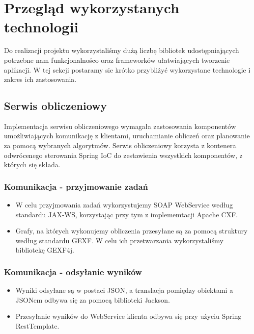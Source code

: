 \section{Przegląd wykorzystanych technologii}

Do realizacji projektu wykorzystaliśmy dużą liczbę bibliotek udostępniających potrzebne nam funkcjonalnośco oraz frameworków ułatwiających tworzenie aplikacji.
W tej sekcji postaramy sie krótko przybliżyć wykorzystane technologie i zakres ich zastosowania.

\subsection{Serwis obliczeniowy}

Implementacja serwisu obliczeniowego wymagała zastosowania komponentów umożliwiających komunikację z klientami, uruchamianie obliczeń oraz planowanie za pomocą wybranych algorytmów.
Serwis obliczeniowy korzysta z kontenera odwrócenego sterowania Spring IoC do zestawienia wszystkich komponentów, z których się składa.

\subsubsection{Komunikacja - przyjmowanie zadań}

\begin{itemize}
	\item W celu przyjmowania zadań wykorzystujemy SOAP WebService według standardu JAX-WS, korzystając przy tym z implememtacji Apache CXF.
	\item Grafy, na których wykonujemy obliczenia przesyłane są za pomocą struktury według standardu GEXF.
	W celu ich przetwarzania wykorzystaliśmy bibliotekę GEXF4j.
\end{itemize}

\subsubsection{Komunikacja - odsyłanie wyników}

\begin{itemize}
	\item Wyniki odsyłane są w postaci JSON, a translacja pomiędzy obiektami a JSONem odbywa się za pomocą biblioteki Jackson.
	\item Przesyłanie wyników do WebService klienta odbywa się przy użyciu Spring RestTemplate.
\end{itemize}

